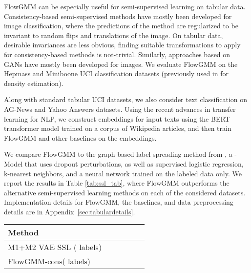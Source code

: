 \documentclass{article}
\newcommand{\method}{FlowGMM\xspace}
\newcommand{\methodcons}{FlowGMM-cons\xspace}
\begin{document}
\method can be especially useful for semi-supervised learning on tabular data.
Consistency-based semi-supervised methods have mostly been developed for image classification, where the predictions of the method are regularized to be invariant to random flips and translations of the image. 
On tabular data, desirable invariances are less obvious, finding suitable transformations to apply for consistency-based methods is not-trivial.
Similarly, approaches based on GANs have mostly been developed for images. We evaluate FlowGMM on the Hepmass and Miniboone UCI classification datasets (previously used in \citet{papamakarios2017masked} for density estimation).

Along with standard tabular UCI datasets, we also consider text classification on \textrm{AG-News} and \textrm{Yahoo Answers} datasets. 
Using the recent advances in transfer learning for NLP, we construct embeddings for input texts using the BERT transformer model \citep{devlin2018bert} trained on a corpus of Wikipedia articles,
and then train \method and other baselines on the embeddings.

We compare \method to the graph based label spreading method from \citet{zhou2004learning}, a -Model \citep{laine2016temporal} that uses dropout perturbations, as well as supervised logistic regression, k-nearest neighbors, and a neural network trained on the labeled data only. 
We report the results in Table \ref{tab:ssl_tab}, where \method outperforms the alternative semi-supervised learning methods on each of the considered datasets. 
Implementation details for \method, the baselines, and data preprocessing details are in Appendix~\ref{sec:tabulardetails}. 

\begin{table*}[t]
	\centering
	\caption{
	Semi-supervised classification accuracy for \methodcons and VAE M1 + M2 model 
	\citep{kingma2014semi} on MNIST for different
	number of labeled data points . 
    }
	\label{tab:labeled}
	\small
	\begin{tabular}{lccccc}
		Method                    & 
		                          &   
                                  &   
                                  &  \\
		\midrule
		M1+M2 VAE SSL ( labels)          &  &   &         & \\
        \methodcons ( labels)            &  &  &  &  \\
	\end{tabular}
\end{table*}
\end{document}
